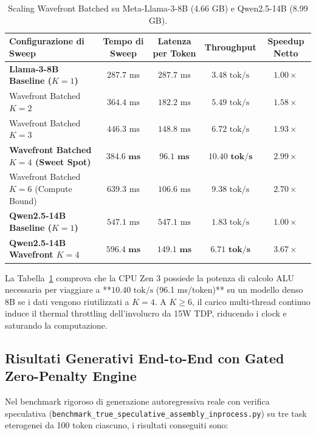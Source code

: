\documentclass[10pt,a4paper]{article}
\theoremstyle{definition}
\begin{document}
\begin{table}[htbp]
\centering
\small
\caption{Scaling Wavefront Batched su Meta-Llama-3-8B (4.66 GB) e Qwen2.5-14B (8.99 GB).}
\label{tab:wavefront_scaling}
\begin{tabular}{lcccc}
\toprule
\textbf{Configurazione di Sweep} & \textbf{Tempo di Sweep} & \textbf{Latenza per Token} & \textbf{Throughput} & \textbf{Speedup Netto} \\
\midrule
\textbf{Llama-3-8B Baseline ($K=1$)} & $287.7\text{ ms}$ & $287.7\text{ ms}$ & $3.48\text{ tok/s}$ & $1.00\times$ \\
Wavefront Batched $K=2$ & $364.4\text{ ms}$ & $182.2\text{ ms}$ & $5.49\text{ tok/s}$ & $1.58\times$ \\
Wavefront Batched $K=3$ & $446.3\text{ ms}$ & $148.8\text{ ms}$ & $6.72\text{ tok/s}$ & $1.93\times$ \\
\textbf{Wavefront Batched $K=4$ (Sweet Spot)} & $\mathbf{384.6\text{ ms}}$ & $\mathbf{96.1\text{ ms}}$ & $\mathbf{10.40\text{ tok/s}}$ & $\mathbf{2.99\times}$ \\
Wavefront Batched $K=6$ (Compute Bound) & $639.3\text{ ms}$ & $106.6\text{ ms}$ & $9.38\text{ tok/s}$ & $2.70\times$ \\
\midrule
\textbf{Qwen2.5-14B Baseline ($K=1$)} & $547.1\text{ ms}$ & $547.1\text{ ms}$ & $1.83\text{ tok/s}$ & $1.00\times$ \\
\textbf{Qwen2.5-14B Wavefront $K=4$} & $\mathbf{596.4\text{ ms}}$ & $\mathbf{149.1\text{ ms}}$ & $\mathbf{6.71\text{ tok/s}}$ & $\mathbf{3.67\times}$ \\
\bottomrule
\end{tabular}
\end{table}

\noindent La Tabella~\ref{tab:wavefront_scaling} comprova che la CPU Zen 3 possiede la potenza di calcolo ALU necessaria per viaggiare a **$10.40\text{ tok/s}$ (96.1 ms/token)** su un modello denso 8B se i dati vengono riutilizzati a $K=4$. A $K \ge 6$, il carico multi-thread continuo induce il thermal throttling dell'involucro da 15W TDP, riducendo i clock e saturando la computazione.

\subsection{Risultati Generativi End-to-End con Gated Zero-Penalty Engine}
Nel benchmark rigoroso di generazione autoregressiva reale con verifica speculativa (\texttt{benchmark\_true\_speculative\_assembly\_inprocess.py}) su tre task eterogenei da 100 token ciascuno, i risultati conseguiti sono:
\end{document}
